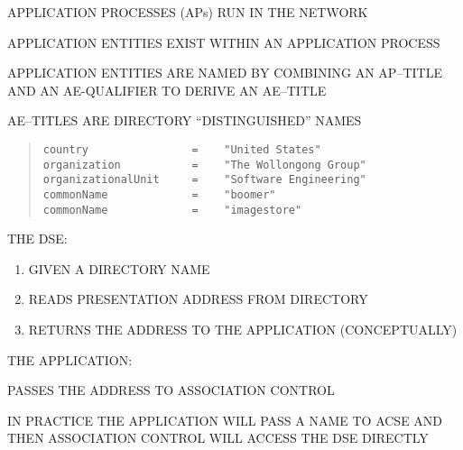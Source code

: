 \begin{bwslide}

\begin{nrtc}
\item	APPLICATION PROCESSES (APs) RUN IN THE NETWORK
\item	APPLICATION ENTITIES EXIST WITHIN AN APPLICATION PROCESS
\item	APPLICATION ENTITIES ARE NAMED BY COMBINING AN AP--TITLE
	AND AN AE-QUALIFIER TO DERIVE AN AE--TITLE
\item	AE--TITLES ARE DIRECTORY ``DISTINGUISHED'' NAMES
\end{nrtc}
\end{bwslide}


\begin{bwslide}

\begin{quote}\small\begin{verbatim}
country                =    "United States"
organization           =    "The Wollongong Group"
organizationalUnit     =    "Software Engineering"
commonName             =    "boomer"
commonName             =    "imagestore"
\end{verbatim}\end{quote}
\end{bwslide}


\begin{bwslide}

\begin{nrtc}
\item	THE DSE:
	\begin{enumerate}
	\item	GIVEN A DIRECTORY NAME
	\item	READS PRESENTATION ADDRESS FROM DIRECTORY
	\item	RETURNS THE ADDRESS TO THE APPLICATION (CONCEPTUALLY) 
	\end{enumerate}
\item	THE APPLICATION:
	\begin{nrtc}
	\item	PASSES THE ADDRESS TO ASSOCIATION CONTROL
	\end{nrtc}
\item	IN PRACTICE THE APPLICATION WILL PASS A NAME TO ACSE AND THEN
	ASSOCIATION CONTROL WILL ACCESS THE DSE DIRECTLY
\end{nrtc}
\end{bwslide}

